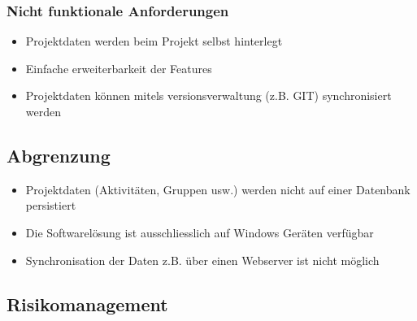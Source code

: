 \subsubsection{Nicht funktionale Anforderungen}
\begin{itemize}
    \item Projektdaten werden beim Projekt selbst hinterlegt
    \item Einfache erweiterbarkeit der Features
    \item Projektdaten können mitels versionsverwaltung (z.B. GIT) synchronisiert werden
\end{itemize}
\newpage
\subsection{Abgrenzung}
\begin{itemize}
    \item Projektdaten (Aktivitäten, Gruppen usw.) werden nicht auf einer Datenbank persistiert
    \item Die Softwarelösung ist ausschliesslich auf Windows Geräten verfügbar
    \item Synchronisation der Daten z.B. über einen Webserver ist nicht möglich
\end{itemize}
\newpage
\subsection{Risikomanagement}
